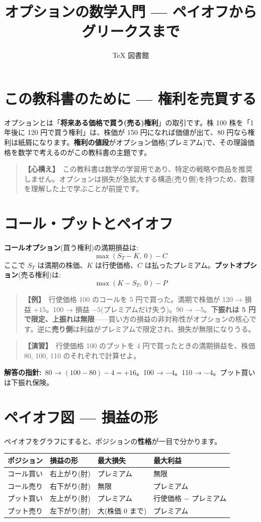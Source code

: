 \documentclass{article}
\title{オプションの数学入門 — ペイオフからグリークスまで}
\author{TeX 図書館}
\begin{document}
\section{この教科書のために — 権利を売買する}

オプションとは「\textbf{将来ある価格で買う(売る)権利}」の取引です。株 100 株を「1 年後に 120 円で買う権利」は、株価が 150 円になれば価値が出て、80 円なら権利は紙屑になります。\textbf{権利の値段}がオプション価格(プレミアム)で、その理論価格を数学で考えるのがこの教科書の主題です。

\begin{quote}
\textbf{【心構え】}\ この教科書は数学の学習用であり、特定の戦略や商品を推奨しません。オプションは損失が急拡大する構造(売り側)を持つため、数理を理解した上で学ぶことが前提です。
\end{quote}

\section{コール・プットとペイオフ}

\textbf{コールオプション}(買う権利)の満期損益は:
\[ \max(S_T - K,\ 0) - C \]
ここで \(S_T\) は満期の株価、\(K\) は行使価格、\(C\) は払ったプレミアム。\textbf{プットオプション}(売る権利)は:
\[ \max(K - S_T,\ 0) - P \]

\begin{quote}
\textbf{【例】}\ 行使価格 100 のコールを 5 円で買った。満期で株価が 120 → 損益 \(+15\)。100 → 損益 \(-5\)(プレミアムだけ失う)。90 → \(-5\)。\textbf{下振れは 5 円で限定、上振れは無限}——買い方の損益の非対称性がオプションの核心です。逆に\textbf{売り側}は利益がプレミアムで限定され、損失が無限になりうる。
\end{quote}

\begin{quote}
\textbf{【演習】}\ 行使価格 100 のプットを 4 円で買ったときの満期損益を、株価 80, 100, 110 のそれぞれで計算せよ。
\end{quote}

\textbf{解答の指針:}\ 80 → \((100-80) - 4 = +16\)。100 → \(-4\)。110 → \(-4\)。プット買いは下振れ保険。

\section{ペイオフ図 — 損益の形}

ペイオフをグラフにすると、ポジションの\textbf{性格}が一目で分かります。

\begin{center}
\begin{tabular}{|l|l|l|l|}
\hline
ポジション & 損益の形 & 最大損失 & 最大利益 \\
\hline
コール買い & 右上がり(肘) & プレミアム & 無限 \\
コール売り & 右下がり(肘) & 無限 & プレミアム \\
プット買い & 左上がり(肘) & プレミアム & 行使価格 − プレミアム \\
プット売り & 左下がり(肘) & 大(株価 0 まで) & プレミアム \\
\hline
\end{tabular}
\end{center}
\end{document}
